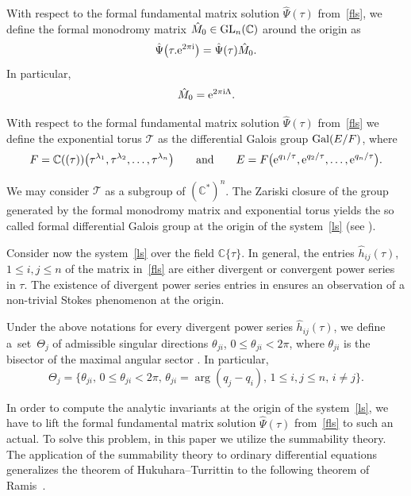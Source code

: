 \documentclass[10pt,a4paper]{amsart}
\numberwithin{equation}{section}
\begin{document}
 \begin{Definition}%
 {With respect to the formal fundamental matrix solution $\hat{\Psi}(\tau)$ from~\eqref{fls}, we define the formal
 monodromy matrix $\hat{M}_0\in{\rm GL}_n(\mathbb{C})$ around the origin as
 \[
 \hat{\Psi}\bigl(\tau. {\rm e}^{2 \pi  {\rm i}}\bigr)=\hat{\Psi}(\tau) \hat{M}_0 .
 \]
 In particular,
 \[
 \hat{M}_0={\rm e}^{2 \pi {\rm i} \Lambda} .
 \]}
 \end{Definition}

 \begin{Definition}%
 With respect to the formal fundamental matrix solution $\hat{\Psi}(\tau)$ from~\eqref{fls} we define the exponential
 torus $\mathcal{T}$ as the differential Galois group ${\rm Gal}(E/F)$, where
 \[
 F=\mathbb{C}((\tau))\bigl(\tau^{\lambda_1}, \tau^{\lambda_2}, \dots, \tau^{\lambda_n}\bigr) \qquad \text{and} \qquad
 E=F\bigl({\rm e}^{q_1/\tau}, {\rm e}^{q_2/\tau}, \dots, {\rm e}^{q_n/\tau}\bigr).
 \]
 \end{Definition}
 We may consider $\mathcal{T}$ as a subgroup of $(\mathbb{C}^*)^n$. The Zariski closure of the group
 generated by the formal monodromy matrix and exponential torus yields the so called formal differential Galois group
 at the origin of the system~\eqref{ls} (see \cite{Si, vPS}).

 Consider now the system~\eqref{ls} over the field $\mathbb{C}\{\tau\}$. In general, the entries $\hat{h}_{ij}(\tau)$, $1 \leq i, j \leq n$
 of the matrix  in~\eqref{fls} are either divergent or convergent power series in $\tau$.
 The existence of divergent power series entries in  ensures an observation of a non-trivial Stokes
 phenomenon at the origin.

 \begin{Definition}\label{st}
 Under the above notations for every divergent power series $\hat{h}_{i j}(\tau)$, we define a~set~$\Theta_j$
 	of admissible singular directions $\theta_{ji}$, $0 \leq \theta_{ji} < 2 \pi$, where $\theta_{ji}$ is the
 	bisector of the maximal angular sector . In
 	particular,
 	 \[
 	 \Theta_j=\{ \theta_{ji},\, 0 \leq \theta_{ji} < 2 \pi,\, \theta_{ji}= \arg (q_j-q_i),\,
 	 1 \leq i, j  \leq n,\, i \neq j \} .
 	 \]
 \end{Definition}
 In order to compute the analytic invariants at the origin of the system~\eqref{ls}, we have to lift the formal
 fundamental matrix solution $\hat{\Psi}(\tau)$ from~\eqref{fls} to such an actual. To solve this problem,
 in this paper we utilize the summability theory. The application of the summability theory to ordinary
 differential equations generalizes the theorem of Hukuhara--Turrittin to the following theorem of Ramis~\cite{R2}.
\end{document}
